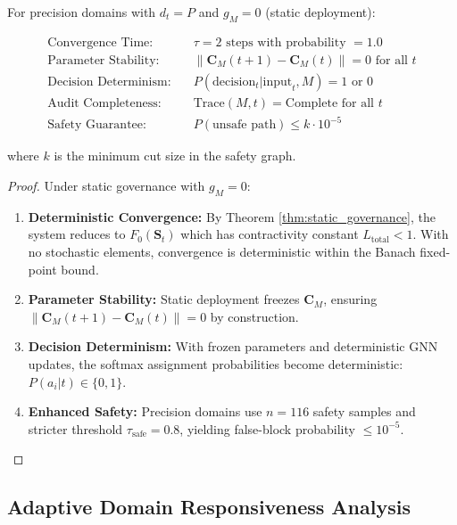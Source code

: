 \documentclass{article}
\begin{document}
\begin{theorem}
\label{thm:precision_domain_extended}
For precision domains with $d_t = P$ and $g_M = 0$ (static deployment):

\begin{align}
\text{Convergence Time:} \quad &\tau = 2 \text{ steps with probability } = 1.0 \\
\text{Parameter Stability:} \quad &\|\mathbf{C}_M(t+1) - \mathbf{C}_M(t)\| = 0 \text{ for all } t \\
\text{Decision Determinism:} \quad &P(\text{decision}_t | \text{input}_t, M) = 1 \text{ or } 0 \\
\text{Audit Completeness:} \quad &\text{Trace}(M, t) = \text{Complete} \text{ for all } t \\
\text{Safety Guarantee:} \quad &P(\text{unsafe path}) \leq k \cdot 10^{-5}
\end{align}

where $k$ is the minimum cut size in the safety graph.
\end{theorem}

\begin{proof}
Under static governance with $g_M = 0$:
\begin{enumerate}
\item \textbf{Deterministic Convergence:} By Theorem \ref{thm:static_governance}, the system reduces to $F_0(\mathbf{S}_t)$ which has contractivity constant $L_{\text{total}} < 1$. With no stochastic elements, convergence is deterministic within the Banach fixed-point bound.

\item \textbf{Parameter Stability:} Static deployment freezes $\mathbf{C}_M$, ensuring $\|\mathbf{C}_M(t+1) - \mathbf{C}_M(t)\| = 0$ by construction.

\item \textbf{Decision Determinism:} With frozen parameters and deterministic GNN updates, the softmax assignment probabilities become deterministic: $P(a_i|t) \in \{0, 1\}$.

\item \textbf{Enhanced Safety:} Precision domains use $n = 116$ safety samples and stricter threshold $\tau_{\text{safe}} = 0.8$, yielding false-block probability $\leq 10^{-5}$.
\end{enumerate}
\end{proof}

\subsection{Adaptive Domain Responsiveness Analysis}
\end{document}

